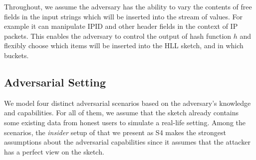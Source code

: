 \documentclass{IEEEtran}
\newcommand{\kenny}[1]{\todo[inline]{\textbf{Kenny:} #1}\xspace}
\begin{document}
Throughout, we assume the adversary has the ability to vary the contents of free fields in the input strings which will be inserted into the stream of values. For example it can manipulate IPID and other header fields in the context of IP packets. This enables the adversary to control the output of hash function $h$ and flexibly choose which items will be inserted into the HLL sketch, and in which buckets.

\subsection{Adversarial Setting}
We model four distinct adversarial scenarios based on the adversary's knowledge and capabilities. For all of them, we assume that the sketch already contains some existing data from honest users to simulate a real-life setting. Among the scenarios, the \textit{insider} setup of \cite{cardestprivacy} that we present as S4 makes the strongest assumptions about the adversarial capabilities since it assumes that the attacker has a perfect view on the sketch. %
\end{document}
